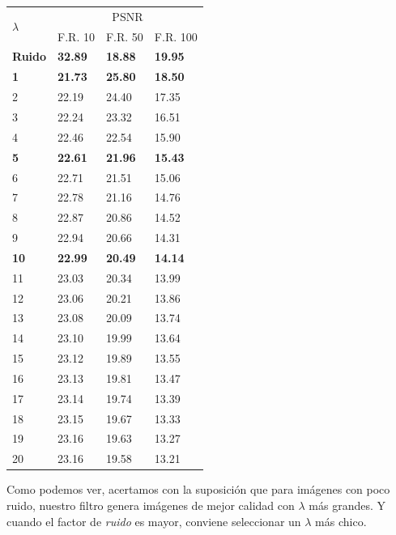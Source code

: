 \documentclass[a4paper]{article}
\begin{document}
\vspace{2em}
\begin{center}
\begin{tabular}{|l|l|l|l|}
  \hline
  \multirow{2}{*}{$\lambda$} & \multicolumn{3}{|c|}{PSNR} \\
  \cline{2-4}
   & F.R. 10 & F.R. 50 & F.R. 100 \\ \hline

  \textbf{Ruido} & 	\textbf{32.89}	 & 	\textbf{18.88} & \textbf{19.95} \\
  \textbf{1}	 & 	\textbf{21.73}	 & 	\textbf{25.80} & \textbf{18.50} \\
  2	 & 	22.19	 & 	24.40	 & 	17.35 \\
  3	 & 	22.24	 & 	23.32	 & 	16.51 \\
  4	 & 	22.46	 & 	22.54	 & 	15.90 \\
  \textbf{5}	 & 	\textbf{22.61}	 & 	\textbf{21.96} & \textbf{15.43} \\
  6	 & 	22.71	 & 	21.51	 & 	15.06 \\
  7	 & 	22.78	 & 	21.16	 & 	14.76 \\
  8	 & 	22.87	 & 	20.86	 & 	14.52 \\
  9	 & 	22.94	 & 	20.66	 & 	14.31 \\
  \textbf{10}	 & 	\textbf{22.99}   &  \textbf{20.49} & \textbf{14.14} \\
  11	 & 	23.03	 & 	20.34	 & 	13.99 \\
  12	 & 	23.06	 & 	20.21	 & 	13.86 \\
  13	 & 	23.08	 & 	20.09	 & 	13.74 \\
  14	 & 	23.10	 & 	19.99	 & 	13.64 \\
  15	 & 	23.12	 & 	19.89	 & 	13.55 \\
  16	 & 	23.13	 & 	19.81	 & 	13.47 \\
  17	 & 	23.14	 & 	19.74	 & 	13.39 \\
  18	 & 	23.15	 & 	19.67	 & 	13.33 \\
  19	 & 	23.16	 & 	19.63	 & 	13.27 \\
  20	 & 	23.16	 & 	19.58	 & 	13.21 \\
  \hline
\end{tabular}
\end{center}

Como podemos ver, acertamos con la suposición que para imágenes con poco ruido, nuestro filtro genera imágenes de mejor calidad con $\lambda$ más grandes. Y cuando el factor de \textit{ruido} es mayor, conviene seleccionar un $\lambda$ más chico.
\end{document}
